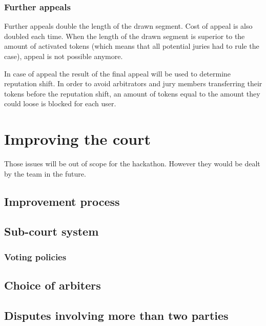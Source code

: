 \documentclass[12 pt]{article}
\begin{document}

\subsubsection{Further appeals}

Further appeals double the length of the drawn segment. Cost of appeal is also doubled each time. When the length of the drawn segment is superior to the amount of activated tokens (which means that all potential juries had to rule the case), appeal is not possible anymore.

In case of appeal the result of the final appeal will be used to determine reputation shift. In order to avoid arbitrators and jury members transferring their tokens before the reputation shift, an amount of tokens equal to the amount they could loose is blocked for each user.



\section{Improving the court}

Those issues will be out of scope for the hackathon. However they would be dealt by the team in the future.

\subsection{Improvement process}

\subsection{Sub-court system}

\subsubsection{Voting policies}
\label{policy}

\subsection{Choice of arbiters}

\subsection{Disputes involving more than two parties}
\end{document}
